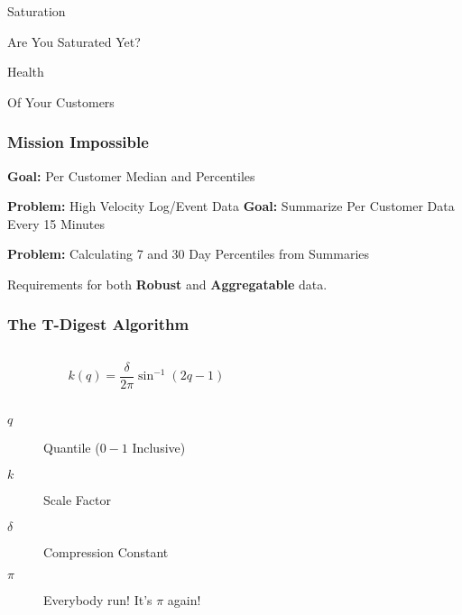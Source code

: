 \begin{frame}[standout]
    Saturation

    \small
    Are You Saturated Yet?
\end{frame}



\begin{frame}[standout]
    Health

    \small
    Of Your Customers
\end{frame}


\begin{frame}
    \frametitle{Mission Impossible}

    \textbf{Goal:} Per Customer Median and Percentiles

    \textbf{Problem:} High Velocity Log/Event Data
    \vskip 0.5cm
    \textbf{Goal:} Summarize Per Customer Data Every 15 Minutes

    \textbf{Problem:} Calculating 7 and 30 Day Percentiles from Summaries

    \vskip 0.5cm
    \centering\Large
    Requirements for both \textbf{Robust} and \textbf{Aggregatable} data.
\end{frame}



\begin{frame}
    \frametitle{The T-Digest Algorithm}

    \begin{columns}
        \begin{column}{0.4\textwidth}

            $$ k(q) = \frac{\delta}{2\pi} \sin^{-1}(2q-1) $$
            ~
            \begin{description}
                \item[$q$] Quantile ($0 - 1$ Inclusive)
                \item[$k$]  Scale Factor
                \item[$\delta$] Compression Constant
                \item[$\pi$] Everybody run!  It's $\pi$ again!
            \end{description}
        \end{column}
        \begin{column}{0.6\textwidth}
            \begin{figure}[!h]
                \centering
                \resizebox{\columnwidth}{!}{}
            \end{figure}
        \end{column}
    \end{columns}
\end{frame}

